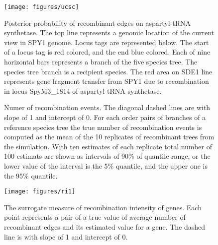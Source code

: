 \documentclass[english]{article}
\begin{document}
\begin{figure}
\texttt{[image: figures/ucsc]}
\caption{\label{fig:muts}Posterior probability of recombinant edges on 
aspartyl-tRNA
synthetase.  The
top line represents a genomic location of the current view in SPY1 genome. Locus
tags are represented below. The start of a locus tag is red colored, and the end
blue colored. Each of nine horizontal bars represents a branch of the five
species tree. The species tree branch is a recipient species.
The red area on SDE1 line represents gene fragment transfer from
SPY1 due to recombination in locus SpyM3\_1814 of aspartyl-tRNA synthetase.}
\end{figure}
\clearpage{}%

\begin{figure}
\caption{\label{fig:h1}Numer of recombination events. The diagonal dashed
lines are with slope of 1 and intercept of 0. For each order
pairs of branches of a reference species tree the true number of recombination
events is computed as the mean of the 10 replicates of recombinant
trees from the simulation. With ten estimates of each replicate total
number of 100 estimats are shown as intervals of 90\% of quantile
range, or the lower value of the interval is the 5\% quantile, and
the upper one is the 95\% quantile. }
\end{figure}
\clearpage{}%

\begin{figure}
\texttt{[image: figures/ri1]}
\caption{\label{fig:ri1}The surrogate measure of recombination intensity
of genes. Each point represents a pair of a true value of average number of
recombinant edges and its estimated value for a gene. The dashed line is with
slope of 1 and intercept of 0.}
\end{figure}
\clearpage{}%
\end{document}
